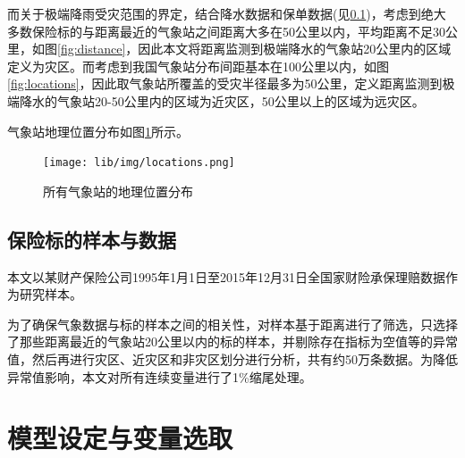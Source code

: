 而关于极端降雨受灾范围的界定，结合降水数据和保单数据(见\ref{sec:data})，考虑到绝大多数保险标的与距离最近的气象站之间距离大多在50公里以内，平均距离不足30公里，如图\ref{fig:distance}，因此本文将距离监测到极端降水的气象站20公里内的区域定义为灾区。而考虑到我国气象站分布间距基本在100公里以内，如图\ref{fig:locations}，因此取气象站所覆盖的受灾半径最多为50公里，定义距离监测到极端降水的气象站20-50公里内的区域为近灾区，50公里以上的区域为远灾区。

气象站地理位置分布如图\ref{fig:location}所示。

\begin{figure}[H]
        \texttt{[image: lib/img/locations.png]}
        \caption{所有气象站的地理位置分布}
        \label{fig:location}
\end{figure}
\subsection{保险标的样本与数据}\label{sec:data}
本文以某财产保险公司1995年1月1日至2015年12月31日全国家财险承保理赔数据作为研究样本。

为了确保气象数据与标的样本之间的相关性，对样本基于距离进行了筛选，只选择了那些距离最近的气象站20公里以内的标的样本，并剔除存在指标为空值等的异常值，然后再进行灾区、近灾区和非灾区划分进行分析，共有约50万条数据。为降低异常值影响，本文对所有连续变量进行了1\%缩尾处理。

\section{模型设定与变量选取}
